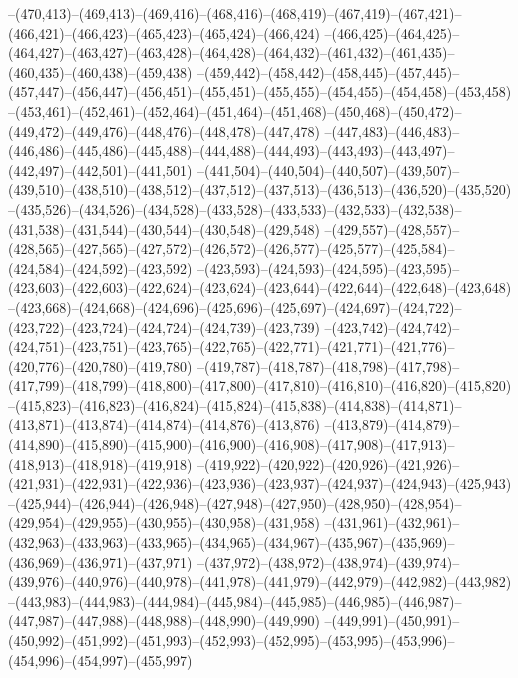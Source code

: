 --(470,413)--(469,413)--(469,416)--(468,416)--(468,419)--(467,419)--(467,421)--(466,421)--(466,423)--(465,423)--(465,424)--(466,424)
--(466,425)--(464,425)--(464,427)--(463,427)--(463,428)--(464,428)--(464,432)--(461,432)--(461,435)--(460,435)--(460,438)--(459,438)
--(459,442)--(458,442)--(458,445)--(457,445)--(457,447)--(456,447)--(456,451)--(455,451)--(455,455)--(454,455)--(454,458)--(453,458)
--(453,461)--(452,461)--(452,464)--(451,464)--(451,468)--(450,468)--(450,472)--(449,472)--(449,476)--(448,476)--(448,478)--(447,478)
--(447,483)--(446,483)--(446,486)--(445,486)--(445,488)--(444,488)--(444,493)--(443,493)--(443,497)--(442,497)--(442,501)--(441,501)
--(441,504)--(440,504)--(440,507)--(439,507)--(439,510)--(438,510)--(438,512)--(437,512)--(437,513)--(436,513)--(436,520)--(435,520)
--(435,526)--(434,526)--(434,528)--(433,528)--(433,533)--(432,533)--(432,538)--(431,538)--(431,544)--(430,544)--(430,548)--(429,548)
--(429,557)--(428,557)--(428,565)--(427,565)--(427,572)--(426,572)--(426,577)--(425,577)--(425,584)--(424,584)--(424,592)--(423,592)
--(423,593)--(424,593)--(424,595)--(423,595)--(423,603)--(422,603)--(422,624)--(423,624)--(423,644)--(422,644)--(422,648)--(423,648)
--(423,668)--(424,668)--(424,696)--(425,696)--(425,697)--(424,697)--(424,722)--(423,722)--(423,724)--(424,724)--(424,739)--(423,739)
--(423,742)--(424,742)--(424,751)--(423,751)--(423,765)--(422,765)--(422,771)--(421,771)--(421,776)--(420,776)--(420,780)--(419,780)
--(419,787)--(418,787)--(418,798)--(417,798)--(417,799)--(418,799)--(418,800)--(417,800)--(417,810)--(416,810)--(416,820)--(415,820)
--(415,823)--(416,823)--(416,824)--(415,824)--(415,838)--(414,838)--(414,871)--(413,871)--(413,874)--(414,874)--(414,876)--(413,876)
--(413,879)--(414,879)--(414,890)--(415,890)--(415,900)--(416,900)--(416,908)--(417,908)--(417,913)--(418,913)--(418,918)--(419,918)
--(419,922)--(420,922)--(420,926)--(421,926)--(421,931)--(422,931)--(422,936)--(423,936)--(423,937)--(424,937)--(424,943)--(425,943)
--(425,944)--(426,944)--(426,948)--(427,948)--(427,950)--(428,950)--(428,954)--(429,954)--(429,955)--(430,955)--(430,958)--(431,958)
--(431,961)--(432,961)--(432,963)--(433,963)--(433,965)--(434,965)--(434,967)--(435,967)--(435,969)--(436,969)--(436,971)--(437,971)
--(437,972)--(438,972)--(438,974)--(439,974)--(439,976)--(440,976)--(440,978)--(441,978)--(441,979)--(442,979)--(442,982)--(443,982)
--(443,983)--(444,983)--(444,984)--(445,984)--(445,985)--(446,985)--(446,987)--(447,987)--(447,988)--(448,988)--(448,990)--(449,990)
--(449,991)--(450,991)--(450,992)--(451,992)--(451,993)--(452,993)--(452,995)--(453,995)--(453,996)--(454,996)--(454,997)--(455,997)
